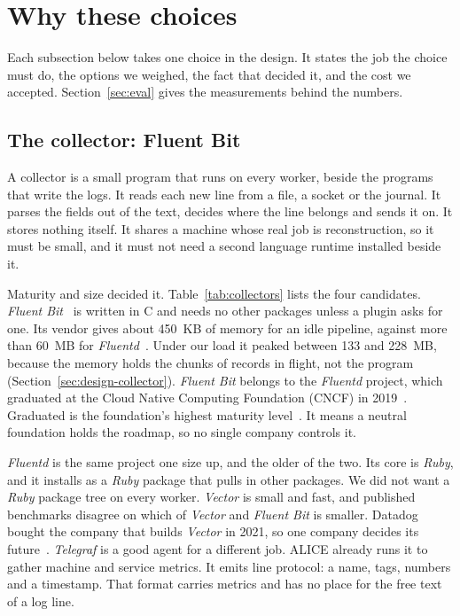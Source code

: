 \section{Why these choices}\label{sec:why}

Each subsection below takes one choice in the design. It states the job the choice must do, the options we weighed, the fact that decided it, and the cost we accepted. Section~\ref{sec:eval} gives the measurements behind the numbers.

\subsection{The collector: Fluent Bit}\label{sec:why-collector}

A collector is a small program that runs on every worker, beside the programs that write the logs. It reads each new line from a file, a socket or the journal. It parses the fields out of the text, decides where the line belongs and sends it on. It stores nothing itself. It shares a machine whose real job is reconstruction, so it must be small, and it must not need a second language runtime installed beside it.

Maturity and size decided it. Table~\ref{tab:collectors} lists the four candidates. \textit{Fluent Bit}~\cite{ref:fluentbit} is written in C and needs no other packages unless a plugin asks for one. Its vendor gives about 450~KB of memory for an idle pipeline, against more than 60~MB for \textit{Fluentd}~\cite{ref:fluentcompare}. Under our load it peaked between 133 and 228~MB, because the memory holds the chunks of records in flight, not the program (Section~\ref{sec:design-collector}). \textit{Fluent Bit} belongs to the \textit{Fluentd} project, which graduated at the Cloud Native Computing Foundation (CNCF) in 2019~\cite{ref:cncffluentd}. Graduated is the foundation's highest maturity level~\cite{ref:cncf}. It means a neutral foundation holds the roadmap, so no single company controls it.

\textit{Fluentd} is the same project one size up, and the older of the two. Its core is \textit{Ruby}, and it installs as a \textit{Ruby} package that pulls in other packages. We did not want a \textit{Ruby} package tree on every worker. \textit{Vector} is small and fast, and published benchmarks disagree on which of \textit{Vector} and \textit{Fluent Bit} is smaller. Datadog bought the company that builds \textit{Vector} in 2021, so one company decides its future~\cite{ref:vector}. \textit{Telegraf} is a good agent for a different job. ALICE already runs it to gather machine and service metrics. It emits line protocol: a name, tags, numbers and a timestamp. That format carries metrics and has no place for the free text of a log line.

